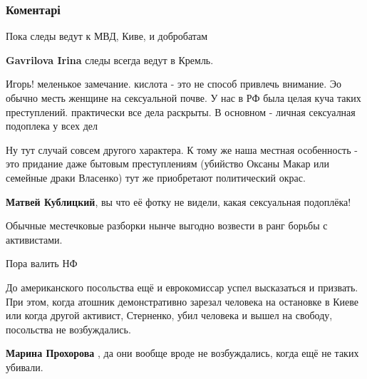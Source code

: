  
 
 
 
 
\subsubsection{Коментарі}

\begin{itemize} %
Пока следы ведут к МВД, Киве, и добробатам

\textbf{Gavrilova Irina} следы всегда ведут в Кремль.


Игорь! меленькое замечание. кислота - это не способ привлечь внимание. Эо
обычно месть женщине на сексуальной почве. У нас в РФ была целая куча таких
преступлений. практически все дела раскрыты. В основном - личная сексуалная
подоплека у всех дел

\begin{itemize} %
Ну тут случай совсем другого характера. К тому же наша местная особенность - это придание даже бытовым преступлениям (убийство Оксаны Макар или семейные драки Власенко) тут же приобретают политический окрас.

\textbf{Матвей Кублицкий}, вы что её фотку не видели, какая сексуальная подоплёка!
\end{itemize} %

Обычные местечковые разборки нынче выгодно возвести в ранг борьбы с активистами.

Пора валить НФ


До американского посольства ещё и еврокомиссар успел высказаться и призвать.
При этом, когда атошник демонстративно зарезал человека на остановке в Киеве
или когда другой активист, Стерненко, убил человека и вышел на свободу,
посольства не возбуждались.

\begin{itemize} %
\textbf{Марина Прохорова} , да они вообще вроде не возбуждались, когда ещё не таких убивали.
\end{itemize} %


\end{itemize}

